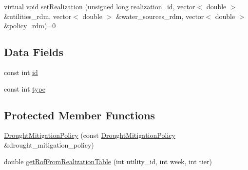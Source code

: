 \begin{DoxyCompactItemize}
\item 
virtual void \mbox{\hyperlink{classDroughtMitigationPolicy_a5d2033543cacca1e412eebef5106eab4_a5d2033543cacca1e412eebef5106eab4}{set\+Realization}} (unsigned long realization\+\_\+id, vector$<$ double $>$ \&utilities\+\_\+rdm, vector$<$ double $>$ \&water\+\_\+sources\+\_\+rdm, vector$<$ double $>$ \&policy\+\_\+rdm)=0
\end{DoxyCompactItemize}
\subsection*{Data Fields}
\begin{DoxyCompactItemize}
\item 
const int \mbox{\hyperlink{classDroughtMitigationPolicy_abf3ed19ed98e0d74dc9ae24094be640b_abf3ed19ed98e0d74dc9ae24094be640b}{id}}
\item 
const int \mbox{\hyperlink{classDroughtMitigationPolicy_aaea5016d1462bec889cb8df85aececc6_aaea5016d1462bec889cb8df85aececc6}{type}}
\end{DoxyCompactItemize}
\subsection*{Protected Member Functions}
\begin{DoxyCompactItemize}
\item 
\mbox{\hyperlink{classDroughtMitigationPolicy_aaf0715876ce33a75c7db92e50523ea0c_aaf0715876ce33a75c7db92e50523ea0c}{Drought\+Mitigation\+Policy}} (const \mbox{\hyperlink{classDroughtMitigationPolicy}{Drought\+Mitigation\+Policy}} \&drought\+\_\+mitigation\+\_\+policy)
\item 
double \mbox{\hyperlink{classDroughtMitigationPolicy_a685ce7eacb01cb262d7e5245a736aa38_a685ce7eacb01cb262d7e5245a736aa38}{get\+Rof\+From\+Realization\+Table}} (int utility\+\_\+id, int week, int tier)
\end{DoxyCompactItemize}
